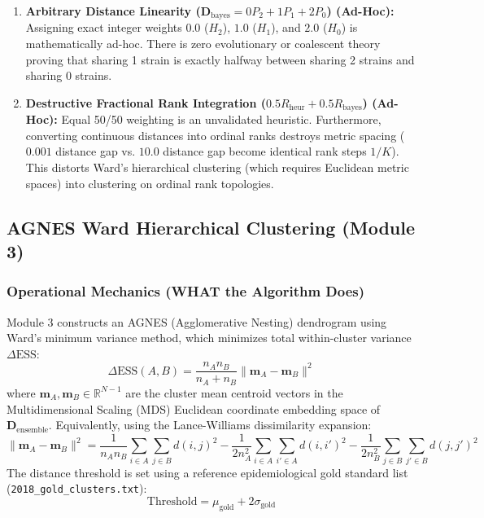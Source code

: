 \documentclass[11pt,a4paper]{article}
\begin{document}
\begin{enumerate}[leftmargin=*]
    \item \textbf{Arbitrary Distance Linearity ($\mathbf{D}_{\text{bayes}} = 0 P_2 + 1 P_1 + 2 P_0$) (Ad-Hoc):} Assigning exact integer weights $0.0$ ($H_2$), $1.0$ ($H_1$), and $2.0$ ($H_0$) is mathematically ad-hoc. There is zero evolutionary or coalescent theory proving that sharing 1 strain is exactly halfway between sharing 2 strains and sharing 0 strains.
    \item \textbf{Destructive Fractional Rank Integration ($0.5 R_{\text{heur}} + 0.5 R_{\text{bayes}}$) (Ad-Hoc):} Equal 50/50 weighting is an unvalidated heuristic. Furthermore, converting continuous distances into ordinal ranks destroys metric spacing ($0.001$ distance gap vs. $10.0$ distance gap become identical rank steps $1/K$). This distorts Ward's hierarchical clustering (which requires Euclidean metric spaces) into clustering on ordinal rank topologies.
\end{enumerate}

\subsection{AGNES Ward Hierarchical Clustering (Module 3)}

\subsubsection{Operational Mechanics (WHAT the Algorithm Does)}
Module 3 constructs an AGNES (Agglomerative Nesting) dendrogram using Ward's minimum variance method, which minimizes total within-cluster variance $\Delta \text{ESS}$:
\begin{equation}
\Delta \text{ESS}(A, B) = \frac{n_A n_B}{n_A + n_B} \|\mathbf{m}_A - \mathbf{m}_B\|^2
\end{equation}
where $\mathbf{m}_A, \mathbf{m}_B \in \mathbb{R}^{N-1}$ are the cluster mean centroid vectors in the Multidimensional Scaling (MDS) Euclidean coordinate embedding space of $\mathbf{D}_{\text{ensemble}}$. Equivalently, using the Lance-Williams dissimilarity expansion:
\begin{equation}
\|\mathbf{m}_A - \mathbf{m}_B\|^2 = \frac{1}{n_A n_B} \sum_{i \in A} \sum_{j \in B} d(i, j)^2 - \frac{1}{2 n_A^2} \sum_{i \in A} \sum_{i' \in A} d(i, i')^2 - \frac{1}{2 n_B^2} \sum_{j \in B} \sum_{j' \in B} d(j, j')^2
\end{equation}
The distance threshold is set using a reference epidemiological gold standard list (\texttt{2018\_gold\_clusters.txt}):
\begin{equation}
\text{Threshold} = \mu_{\text{gold}} + 2 \sigma_{\text{gold}}
\end{equation}
\end{document}
